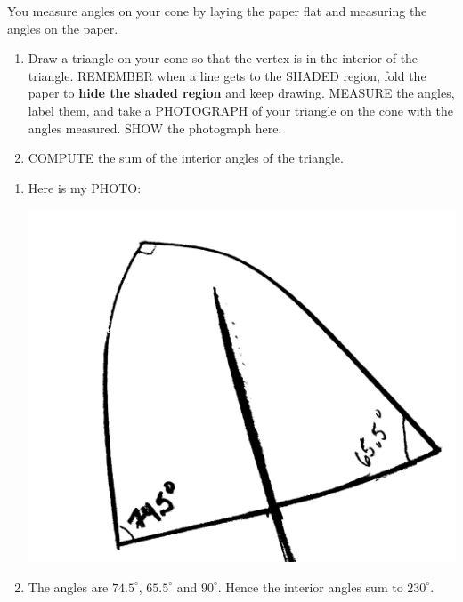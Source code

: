 \documentclass[nooutcomes,noauthor]{ximera}
\begin{document}
\mynewpage



\begin{question}
   You measure angles on your cone by laying the paper flat and
   measuring the angles on the paper.
   \begin{enumerate}
   \item Draw a triangle on your cone so that the vertex is in the
     interior of the triangle. REMEMBER when a line gets to the SHADED
     region, fold the paper to \textbf{hide the shaded region} and
     keep drawing. MEASURE the angles, label them, and take a
     PHOTOGRAPH of your triangle on the cone with the angles
     measured. SHOW the photograph here.
     \item COMPUTE the sum of the interior angles of the triangle.
   \end{enumerate}
   \begin{freeResponse}
     \begin{enumerate}
     \item Here is my PHOTO:
       \begin{center}
         \includegraphics[width=.4\textwidth]{conePhoto.jpg}
       \end{center}
       
     \item The angles are $74.5^\circ$, $65.5^\circ$ and
       $90^\circ$. Hence the interior angles sum to $230^\circ$.
     \end{enumerate}
   \end{freeResponse}
\end{question}

\mynewpage
\end{document}
